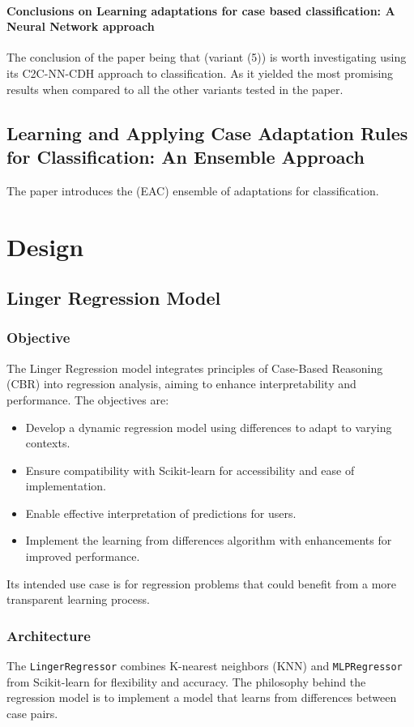 \documentclass[a4paper, 12pt]{report}
\begin{document}
\subsubsection{Conclusions on Learning adaptations for case based classification: A Neural Network approach}
The conclusion of the paper \cite{ye2021learning} being that (variant (5)) is worth investigating using its C2C-NN-CDH approach to classification. 
As it yielded the most promising results when compared to all the other variants tested in the paper.


\section{Learning and Applying Case Adaptation Rules for Classification: An Ensemble Approach}
The paper \cite{jalali2017learning} introduces the (EAC) ensemble of adaptations for classification. 

\chapter{Design}
\label{ch:Design}

\section{Linger Regression Model}

\subsection{Objective}
The Linger Regression model integrates principles of Case-Based Reasoning (CBR) into regression analysis, aiming to enhance interpretability and performance. The objectives are:
\begin{itemize}
    \item Develop a dynamic regression model using differences to adapt to varying contexts.
    \item Ensure compatibility with Scikit-learn for accessibility and ease of implementation.
    \item Enable effective interpretation of predictions for users.
    \item Implement the learning from differences algorithm with enhancements for improved performance.
\end{itemize}
Its intended use case is for regression problems that could benefit from a more transparent learning process. 

\subsection{Architecture}
The \texttt{LingerRegressor} combines K-nearest neighbors (KNN) and \texttt{MLPRegressor} from Scikit-learn for flexibility and accuracy.
The philosophy behind the regression model is to implement a model that learns from differences between case pairs. 
\end{document}
